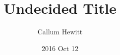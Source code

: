 \documentclass{UoYCSproject}{}
\title{Undecided Title}
\author{Callum Hewitt}
\date{2016 Oct 12}
\begin{document}
\maketitle
\listoffigures
\listoftables





{}
\end{document}
